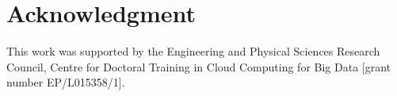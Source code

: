 \documentclass[conference]{IEEEtran}
\begin{document}


\section{Acknowledgment}

This work was supported by the Engineering and Physical Sciences Research Council, Centre for Doctoral Training in Cloud Computing for Big Data [grant number EP/L015358/1].





\end{document}
